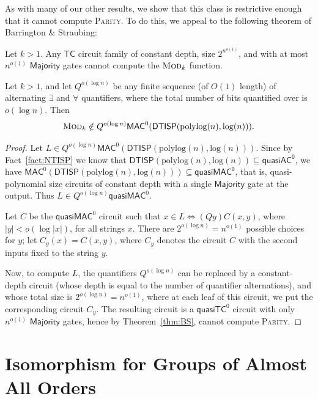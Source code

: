 \documentclass{theoretics}
\newcommand{\algprobm}[1]{\textsc{#1}\xspace}
\newcommand*{\ComplexityClass}[1]{\ensuremath{\mathsf{#1}}\xspace}
\newcommand{\DTISP}{\ComplexityClass{DTISP}}
\newcommand{\DTISPpll}{\ensuremath{\DTISP(\mathrm{polylog}(n),\mathrm{log}(n))}\xspace}
\newcommand{\qACz}{\ComplexityClass{quasiAC^0}}
\begin{document}
As with many of our other results, we show that this class is restrictive enough that it cannot compute \algprobm{Parity}. To do this, we appeal to the following theorem of Barrington \& Straubing:

\begin{theorem} \label{thm:BS}
Let $k > 1$. Any $\mathsf{TC}$ circuit family of constant depth, size $2^{n^{o(1)}}$, and with at most $n^{o(1)}$ $\mathsf{Majority}$ gates cannot compute the $\algprobm{Mod}_k$ function.
\end{theorem}

\begin{corollary} \label{cor:MAC}
Let $k > 1$, and let $Q^{o(\log n)}$ be any finite sequence (of $O(1)$ length) of alternating $\exists$ and $\forall$ quantifiers, where the total number of bits quantified over is $o(\log n)$. Then 
\[
\algprobm{Mod}_k \notin Q^{o(\log n)} \mathsf{MAC}^0(\DTISPpll).
\]
\end{corollary}

\begin{proof}
Let $L \in Q^{o(\log n)} \mathsf{MAC}^0(\DTISPpll)$. 
Since by Fact~\ref{fact:NTISP} we know that $\DTISPpll \subseteq \qACz$, we have $\mathsf{MAC}^0(\DTISPpll) \subseteq \mathsf{quasiMAC^0}$, that is, quasi-polynomial size circuits of constant depth with a single $\mathsf{Majority}$ gate at the output. Thus $L \in Q^{o(\log n)} \mathsf{quasiMAC}^0$. 


Let $C$ be the $\mathsf{quasiMAC}^0$ circuit such that $x \in L \iff (Qy) C(x,y)$, where $|y| < o(\log |x|)$, for all strings $x$. There are $2^{o(\log n)}=n^{o(1)}$ possible choices for $y$; let $C_y(x) = C(x,y)$, where $C_y$ denotes the circuit $C$ with the second inputs fixed to the string $y$.

Now, to compute $L$, the quantifiers $Q^{o(\log n)}$ can be replaced by a constant-depth circuit (whose depth is equal to the number of quantifier alternations), and whose total size is $2^{o(\log n)} = n^{o(1)}$, where at each leaf of this circuit, we put the corresponding circuit $C_y$. The resulting circuit is a $\mathsf{quasiTC}^0$ circuit with only $n^{o(1)}$ $\mathsf{Majority}$ gates, hence by Theorem~\ref{thm:BS}, cannot compute \algprobm{Parity}.
\end{proof}




\section{Isomorphism for Groups of Almost All Orders}
\end{document}

